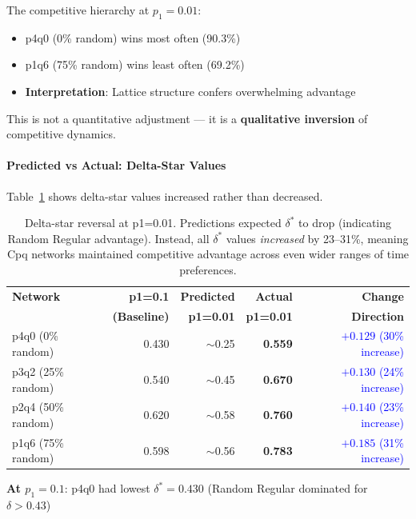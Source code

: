 \documentclass[12pt,a4paper]{article}
\begin{document}
The competitive hierarchy at $p_1=0.01$:
\begin{itemize}
    \item p4q0 (0\% random) wins most often (90.3\%)
    \item p1q6 (75\% random) wins least often (69.2\%)
    \item \textbf{Interpretation}: Lattice structure confers overwhelming advantage
\end{itemize}

This is not a quantitative adjustment --- it is a \textbf{qualitative inversion} of competitive dynamics.

\paragraph{Predicted vs Actual: Delta-Star Values}

Table~\ref{tab:p1_comparison_deltastar} shows delta-star values increased rather than decreased.

\begin{table}[H]
\centering
\begin{tabular}{@{}lrrrr@{}}
\toprule
\textbf{Network} & \textbf{p1=0.1} & \textbf{Predicted} & \textbf{Actual} & \textbf{Change} \\
 & \textbf{(Baseline)} & \textbf{p1=0.01} & \textbf{p1=0.01} & \textbf{Direction} \\
\midrule
p4q0 (0\% random)  & 0.430 & $\sim$0.25 & \textbf{0.559} & \textcolor{blue}{$+0.129$ (30\% increase)} \\
p3q2 (25\% random) & 0.540 & $\sim$0.45 & \textbf{0.670} & \textcolor{blue}{$+0.130$ (24\% increase)} \\
p2q4 (50\% random) & 0.620 & $\sim$0.58 & \textbf{0.760} & \textcolor{blue}{$+0.140$ (23\% increase)} \\
p1q6 (75\% random) & 0.598 & $\sim$0.56 & \textbf{0.783} & \textcolor{blue}{$+0.185$ (31\% increase)} \\
\bottomrule
\end{tabular}
\caption{Delta-star reversal at p1=0.01. Predictions expected $\delta^*$ to drop (indicating Random Regular advantage). Instead, all $\delta^*$ values \textit{increased} by 23--31\%, meaning Cpq networks maintained competitive advantage across even wider ranges of time preferences.}
\label{tab:p1_comparison_deltastar}
\end{table}

\textbf{At $p_1=0.1$}: p4q0 had lowest $\delta^* = 0.430$ (Random Regular dominated for $\delta > 0.43$)
\end{document}
